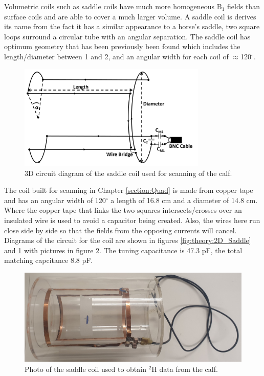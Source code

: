 \documentclass[class=article, crop=false]{standalone}
\begin{document}
Volumetric coils such as saddle coils have much more homogeneous B$_1$ fields than surface coils and are able to cover a much larger volume. A saddle coil is derives its name from the fact it has a similar appearance to a horse's saddle, two square loops surround a circular tube with an angular separation. The saddle coil has optimum geometry that has been previously been found which includes the length/diameter between 1 and 2, and an angular width for each coil of $\approx$120$^\circ$\cite{Ginsberg1970OptimumField,Salmon2006OptimizationImaging}.

\begin{figure}
    \centering
    \includegraphics[width=0.8\textwidth]{Figures/Theory/3D_Saddle.png}
    \caption{3D circuit diagram of the saddle coil used for scanning of the calf.}
    \label{fig:theory:3D_Saddle}
\end{figure}

The coil built for scanning in Chapter \ref{section:Quad} is made from copper tape and has an angular width of 120$^\circ$ a length of 16.8 cm and a diameter of 14.8 cm. Where the copper tape that links the two squares intersects/crosses over an insulated wire is used to avoid a capacitor being created. Also, the wires here run close side by side so that the fields from the opposing currents will cancel. Diagrams of the circuit for the coil are shown in figures \ref{fig:theory:2D_Saddle} and \ref{fig:theory:3D_Saddle} with pictures in figure \ref{fig:theory:Saddle_pic}. The tuning capacitance is 47.3 pF, the total matching capcitance 8.8 pF.

\begin{figure}
    \centering
    \includegraphics[width=1\textwidth]{Figures/Theory/Saddle_Coil.jpg}
    \caption{Photo of the saddle coil used to obtain $^2$H data from the calf.}
    \label{fig:theory:Saddle_pic}
\end{figure}
\end{document}
